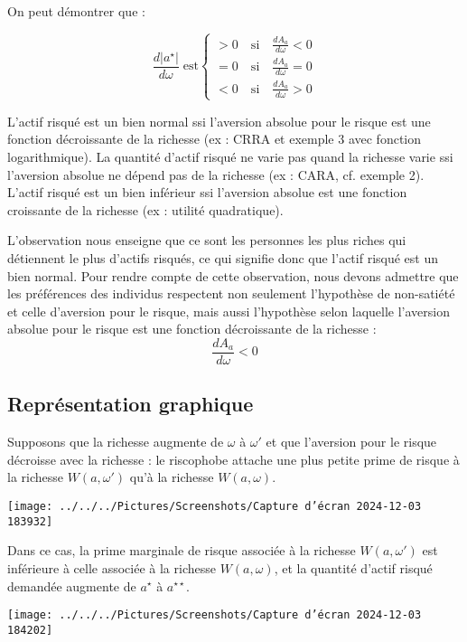 \documentclass[a4paper, 12pt]{report}
\begin{document}
On peut démontrer que : 

\[ \frac{d\left| a^{\star} \right|}{d\omega} \;\text{est}\begin{cases}
	> 0 \quad \text{si} \quad \frac{dA_a}{d\omega} < 0 \\
	= 0 \quad \text{si} \quad \frac{dA_a}{d\omega} = 0\\
	< 0 \quad \text{si} \quad \frac{dA_a}{d\omega} > 0
\end{cases} \]

L'actif risqué est un bien normal ssi l'aversion absolue pour le risque est une fonction décroissante de la richesse (ex : CRRA et exemple 3 avec fonction logarithmique). La quantité d'actif risqué ne varie pas quand la richesse varie ssi l'aversion absolue ne dépend pas de la richesse (ex : CARA, cf. exemple 2). L'actif risqué est un bien inférieur ssi l'aversion absolue est une fonction croissante de la richesse (ex : utilité quadratique).

L'observation nous enseigne que ce sont les personnes les plus riches qui détiennent le plus d'actifs risqués, ce qui signifie donc que l'actif risqué est un bien normal. Pour rendre compte de cette observation, nous devons admettre que les préférences des individus respectent non seulement l'hypothèse de non-satiété et celle d'aversion pour le risque, mais aussi l'hypothèse selon laquelle l'aversion absolue pour le risque est une fonction décroissante de la richesse :
\[
\frac{dA_a}{d\omega} < 0
\]

\subsection{Représentation graphique}

Supposons que la richesse augmente de \(\omega\) à \(\omega'\) et que l'aversion pour le risque décroisse avec la richesse : le riscophobe attache une plus petite prime de risque à la richesse \(W(a, \omega')\) qu'à la richesse \(W(a, \omega)\).

\begin{center}
	\texttt{[image: ../../../Pictures/Screenshots/Capture d'écran 2024-12-03 183932]}
\end{center}

Dans ce cas, la prime marginale de risque associée à la richesse \(W(a, \omega')\) est inférieure à celle associée à la richesse \(W(a, \omega)\), et la quantité d'actif risqué demandée augmente de \(a^{\star}\) à \(a^{\star \star}\).

\begin{center}
	\texttt{[image: ../../../Pictures/Screenshots/Capture d'écran 2024-12-03 184202]}
\end{center}
\end{document}
